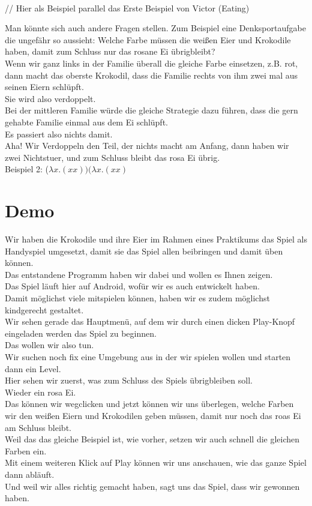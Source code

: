 \documentclass{scrartcl}
\begin{document}
	\ \\
		
	// Hier als Beispiel parallel das Erste Beispiel von Victor (Eating)
	
	Man könnte sich auch andere Fragen stellen. Zum Beispiel eine Denksportaufgabe die ungefähr so aussieht:
	Welche Farbe müssen die weißen Eier und Krokodile haben, damit zum Schluss nur das rosane Ei übrigbleibt?\\
	Wenn wir ganz links in der Familie überall die gleiche Farbe einsetzen, z.B. rot, dann macht das oberste Krokodil, dass die Familie rechts von ihm zwei mal aus seinen Eiern schlüpft.\\
	Sie wird also verdoppelt.\\
	Bei der mittleren Familie würde die gleiche Strategie dazu führen, dass die gern gehabte Familie einmal aus dem Ei schlüpft.\\
	Es passiert also nichts damit.\\
	Aha! Wir Verdoppeln den Teil, der nichts macht am Anfang, dann haben wir zwei Nichtstuer, und zum Schluss bleibt das rosa Ei übrig. \\

	Beispiel 2: ($\lambda x . ( x x ) )(\lambda x . ( x x ) $

	\section{Demo}
	Wir haben die Krokodile und ihre Eier im Rahmen eines Praktikums das Spiel als Handyspiel umgesetzt, damit sie das Spiel allen beibringen und damit üben können.\\
	Das entstandene Programm haben wir dabei und wollen es Ihnen zeigen.\\
	Das Spiel läuft hier auf Android, wofür wir es auch entwickelt haben.\\
	Damit möglichst viele mitspielen können, haben wir es zudem möglichst kindgerecht gestaltet.\\
	Wir sehen gerade das Hauptmenü, auf dem wir durch einen dicken Play-Knopf eingeladen werden das Spiel zu beginnen.\\
	Das wollen wir also tun.\\
	Wir suchen noch fix eine Umgebung aus in der wir spielen wollen und starten dann ein Level.\\
	Hier sehen wir zuerst, was zum Schluss des Spiels übrigbleiben soll.\\
	Wieder ein rosa Ei.\\
	Das können wir wegclicken und jetzt können wir uns überlegen, welche Farben wir den weißen Eiern und Krokodilen geben müssen, damit nur noch das roas Ei am Schluss bleibt.\\
	Weil das das gleiche Beispiel ist, wie vorher, setzen wir auch schnell die gleichen Farben ein.\\
	Mit einem weiteren Klick auf Play können wir uns anschauen, wie das ganze Spiel dann abläuft.\\
	Und weil wir alles richtig gemacht haben, sagt uns das Spiel, dass wir gewonnen haben.\\
	
\end{document}
